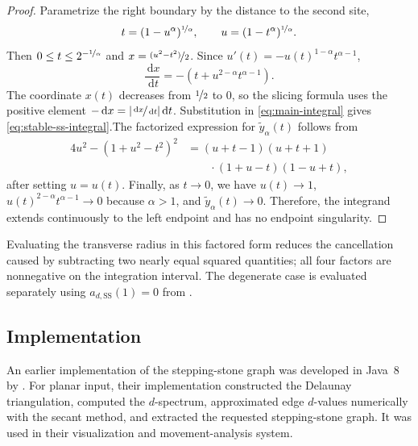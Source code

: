 \documentclass[a4paper,fleqn]{cas-dc}
\theoremstyle{definition}
\theoremstyle{remark}
\newcommand{\dd}{\,\mathrm{d}}
\newcommand{\0}{\mathbf{0}}
\begin{document}
\begin{proof}
Parametrize the right boundary by the distance to the second site,
\begin{equation}
t=(1-u^\alpha)^{\nicefrac{1}{\alpha}},
\qquad
u=(1-t^\alpha)^{\nicefrac{1}{\alpha}}.
\end{equation}
Then $0\leq t\leq2^{-\nicefrac{1}{\alpha}}$ and
$x=\nicefrac{(u^2-t^2)}{2}$. Since
$u'(t)=-u(t)^{1-\alpha}t^{\alpha-1}$,
\begin{equation}
\frac{\dd x}{\dd t}
=-
\left(t+u^{2-\alpha}t^{\alpha-1}\right).
\end{equation}
The coordinate $x(t)$ decreases from $\nicefrac{1}{2}$ to $0$, so the slicing formula
uses the positive element
$-\dd x=|\nicefrac{\dd x}{\dd t}|\dd t$. Substitution in \eqref{eq:main-integral}
gives \eqref{eq:stable-ss-integral}.The factorized expression for \(\widetilde y_\alpha(t)\) follows from
\begin{equation}
\begin{aligned}
4u^2-(1+u^2-t^2)^2
&=
(u+t-1)(u+t+1)
\\
&\qquad{}\cdot
(1+u-t)(1-u+t),
\end{aligned}
\end{equation}
after setting \(u=u(t)\). Finally, as \(t\to0\), we have
\(u(t)\to1\),
\(
u(t)^{2-\alpha}t^{\alpha-1}\to0
\)
because \(\alpha>1\), and
\(\widetilde y_\alpha(t)\to0\). Therefore, the integrand extends
continuously to the left endpoint and has no endpoint singularity.
\end{proof}

Evaluating the transverse radius in this factored form reduces the
cancellation caused by subtracting two nearly equal squared quantities;
all four factors are nonnegative on the integration interval.
The degenerate case is evaluated separately using
$a_{d,\mathrm{SS}}(1)=0$ from .

\subsection{Implementation}
\label{sec:implementation}

An earlier implementation of the stepping-stone graph was developed in
Java~8 by \citet[Sec.~4.2]{kannangara2018stepping}. For planar input, their
implementation constructed the Delaunay triangulation, computed the
$d$-spectrum, approximated edge $d$-values numerically with the secant
method, and extracted the requested stepping-stone graph. It was used in
their visualization and movement-analysis system.
\end{document}
